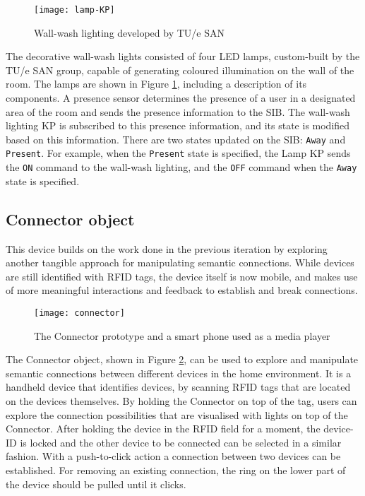 \begin{figure}
\centering
\texttt{[image: lamp-KP]}
\caption{Wall-wash lighting developed by TU/e SAN}
\label{wallwash}
\end{figure}

The decorative wall-wash lights consisted of four LED lamps, custom-built by the TU/e \ac{SAN} group, capable of generating coloured illumination on the wall of the room. The lamps are shown in Figure \ref{wallwash}, including a description of its components. A presence sensor determines the presence of a user in a designated area of the room and sends the presence information to the \ac{SIB}. The wall-wash lighting \ac{KP} is subscribed to this presence information, and its state is modified based on this information. There are two states updated on the \ac{SIB}: \texttt{Away} and \texttt{Present}. For example, when the \texttt{Present} state is specified, the Lamp \ac{KP} sends  the \texttt{ON} command to the wall-wash lighting, and the \texttt{OFF} command when the \texttt{Away} state is specified.  


\subsection{Connector object}
\label{Connector}
This device builds on the work done in the previous iteration by exploring another tangible approach for manipulating semantic connections. While devices are still identified with \ac{RFID} tags, the device itself is now mobile, and makes use of more meaningful interactions and feedback to establish and break connections.

\begin{figure}
\centering
\texttt{[image: connector]}
\caption{The Connector prototype and a smart phone used as a media player}
\label{connector}
\end{figure}

The Connector object, shown in Figure \ref{connector}, can be used to explore and manipulate semantic connections between different devices in the home environment. It is a handheld device that identifies devices, by scanning \ac{RFID} tags that are located on the devices themselves. By holding the Connector on top of the tag, users can explore the connection possibilities that are visualised with lights on top of the Connector. After holding the device in the \ac{RFID} field for a moment, the device-ID is locked and the other device to be connected can be selected in a similar fashion. With a push-to-click action a connection between two devices can be established. For removing an existing connection, the ring on the lower part of the device should be pulled until it clicks.

